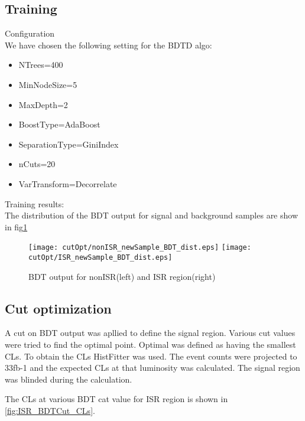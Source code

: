 \FloatBarrier
\subsection{Training}
Configuration\\
We have chosen the following setting for the BDTD algo:
\begin{itemize}
\item NTrees=400
\item MinNodeSize=5%
\item MaxDepth=2
\item BoostType=AdaBoost
\item SeparationType=GiniIndex
\item nCuts=20
\item VarTransform=Decorrelate
\end{itemize}


Training results:\\
The distribution of the BDT output for signal and background samples are show in fig\ref{fig:BDT_output}

\begin{figure}
\texttt{[image: cutOpt/nonISR\_newSample\_BDT\_dist.eps]}
\texttt{[image: cutOpt/ISR\_newSample\_BDT\_dist.eps]}
\caption{BDT output for nonISR(left) and ISR region(right)}
\label{fig:BDT_output}
\end{figure}

\subsection{Cut optimization}
A cut on BDT output was apllied to define the signal region. Various cut values were tried to find the optimal point. Optimal was defined as having the smallest CLs. To obtain the CLs HistFitter was used. The event counts were projected to 33fb-1 and the expected CLs at that luminosity was calculated. The signal region was blinded during the calculation.

The CLs at various BDT cat value for ISR region is shown in \ref{fig:ISR_BDTCut_CLs}.

